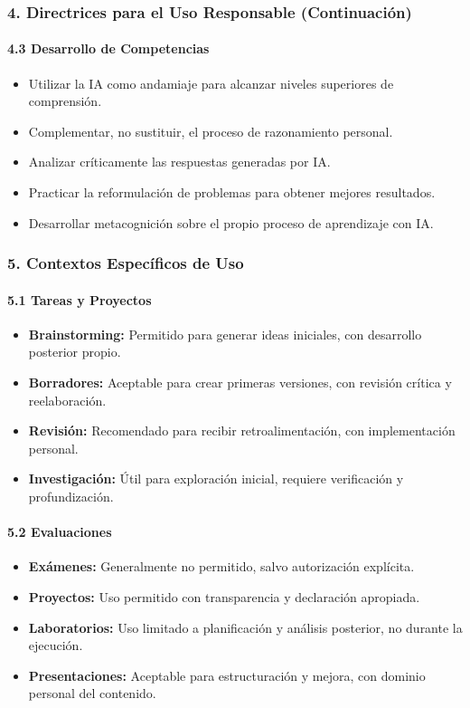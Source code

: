 \documentclass{beamer}
\begin{document}
	\begin{frame}
		\frametitle{4. Directrices para el Uso Responsable (Continuación)}
		\framesubtitle{4.3 Desarrollo de Competencias}
		\begin{itemize}
			\item Utilizar la IA como andamiaje para alcanzar niveles superiores de comprensión.
			\item Complementar, no sustituir, el proceso de razonamiento personal.
			\item Analizar críticamente las respuestas generadas por IA.
			\item Practicar la reformulación de problemas para obtener mejores resultados.
			\item Desarrollar metacognición sobre el propio proceso de aprendizaje con IA.
		\end{itemize}
	\end{frame}
	
	\begin{frame}
		\frametitle{5. Contextos Específicos de Uso}
		\framesubtitle{5.1 Tareas y Proyectos}
		\begin{itemize}
			\item \textbf{Brainstorming:} Permitido para generar ideas iniciales, con desarrollo posterior propio.
			\item \textbf{Borradores:} Aceptable para crear primeras versiones, con revisión crítica y reelaboración.
			\item \textbf{Revisión:} Recomendado para recibir retroalimentación, con implementación personal.
			\item \textbf{Investigación:} Útil para exploración inicial, requiere verificación y profundización.
		\end{itemize}
		\pause
		\framesubtitle{5.2 Evaluaciones}
		\begin{itemize}
			\item \textbf{Exámenes:} Generalmente no permitido, salvo autorización explícita.
			\item \textbf{Proyectos:} Uso permitido con transparencia y declaración apropiada.
			\item \textbf{Laboratorios:} Uso limitado a planificación y análisis posterior, no durante la ejecución.
			\item \textbf{Presentaciones:} Aceptable para estructuración y mejora, con dominio personal del contenido.
		\end{itemize}
	\end{frame}
	
\end{document}
